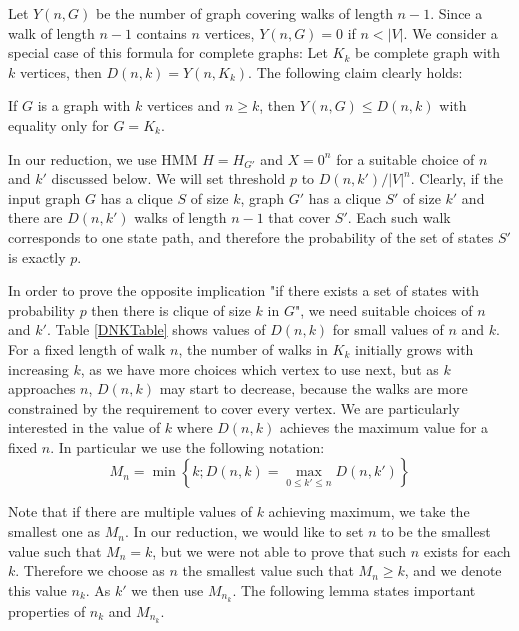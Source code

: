 Let $Y(n, G)$ be the number of graph covering walks of length $n-1$. Since a walk
of length $n - 1$ contains $n$ vertices, $Y(n, G)=0$ if $n<|V|$. We consider a
special case of this formula for complete graphs: Let $K_k$ be
complete graph with $k$ vertices, then $D(n, k) = Y(n, K_k)$. The following claim
clearly holds:

\begin{lemma}\label{NotCliqueIsSmaller}
If $G$ is a graph with $k$ vertices and $n\ge k$, then
$Y(n,G)\le D(n,k)$ with equality only for $G=K_k$. 
\end{lemma}

In our reduction, we use HMM $H=H_{G'}$ and $X=0^n$ for a suitable choice of
$n$ and $k'$ discussed below. We will set threshold $p$ to $D(n,k')/|V|^{n}$.
Clearly, if the input graph $G$ has a clique $S$ of size $k$, graph $G'$ has a
clique $S'$ of size $k'$ and there are $D(n,k')$ walks of length $n-1$ that cover
$S'$. Each such walk corresponds to one state path, and therefore the
probability of the set of states $S'$ is exactly $p$. 

In order to prove the opposite implication "if there exists a set of states with
probability $p$ then there is clique of size $k$ in $G$", we need suitable choices
of $n$ and $k'$. Table \ref{DNKTable} shows values of $D(n,k)$ for
small values of $n$ and $k$. For a fixed length of walk $n$, the
number of walks in $K_k$ initially grows with increasing $k$, as we
have more choices which vertex to use next, but as $k$ approaches $n$,
$D(n,k)$  may start to decrease, because the walks are more constrained by
the requirement to cover every vertex. We are particularly interested in
the value of $k$ where $D(n,k)$ achieves the maximum value for a fixed $n$. 
In particular we use the following notation:
$$M_{n} = \min\left\{k ; D(n,k) = \max_{0\leq k'\leq
  n}D(n,k')\right\}$$
  
Note that if there are multiple values
of $k$ achieving maximum, we take the smallest one as $M_n$.  In our
reduction, we would like to set $n$ to be the smallest value such that
$M_n=k$, but we were not able to prove that such $n$ exists for each $k$.
Therefore we choose as $n$ the smallest value such that $M_n\ge k$, and 
we denote this value $n_k$. As $k'$ we then use $M_{n_k}$. The following 
lemma states important properties of $n_k$ and $M_{n_k}$. 


